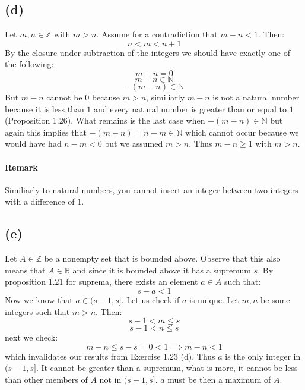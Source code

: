 \documentclass{article}
\begin{document}
\subsection*{(d)}
Let \(m, n \in \mathbb{Z}\) with \(m > n\). Assume for a contradiction that \(m - n < 1\). Then:
\begin{equation*}
    n < m < n + 1
\end{equation*}
By the closure under subtraction of the integers we should have exactly one of the following:
\begin{equation*}
    m - n = 0
\end{equation*}
\begin{equation*}
    m - n \in \mathbb{N}
\end{equation*}
\begin{equation*}
    - (m - n) \in \mathbb{N}
\end{equation*}
But \(m - n\) cannot be \(0\) because \(m > n\), similiarly \(m - n\) is not a natural number because it is less than \(1\)
and every natural number is greater than or equal to \(1\) (Proposition 1.26). What remains is the last case when
\(- (m - n) \in \mathbb{N}\) but again this implies that \(-(m - n) = n - m \in \mathbb{N}\) which cannot occur because 
we would have had \(n - m < 0\) but we assumed \(m > n\). Thus \(m - n \geq 1\) with \(m > n\).

\paragraph*{Remark} Similiarly to natural numbers, you cannot insert an integer between two integers with a difference of \(1\).

\newpage
\subsection*{(e)}
Let \(A \in \mathbb{Z}\) be a nonempty set that is bounded above. Observe that
this also means that \(A \in \mathbb{R}\) and since it is bounded above it has a supremum \(s\). 
By proposition 1.21 for suprema, there exists an element \(a \in A\) such that:
\begin{equation*}
    s - a < 1
\end{equation*} 
Now we know that \(a \in (s - 1, s]\). Let us check if \(a\) is unique. Let \(m, n\) be some integers such that \(m > n\). Then:
\begin{equation*}
    s - 1 < m \leq s
\end{equation*}
\begin{equation*}
    s - 1 < n \leq s
\end{equation*} 
next we check:
\begin{equation*}
    m - n \leq s - s = 0 < 1 \implies m - n < 1
\end{equation*}
which invalidates our results from Exercise 1.23 (d). Thus \(a\) is the only integer in \((s - 1, s]\). It cannot be greater
than a supremum, what is more, it cannot be less than other members of \(A\) not in \((s - 1, s]\).
\(a\) must be then a maximum of \(A\).
\end{document}
